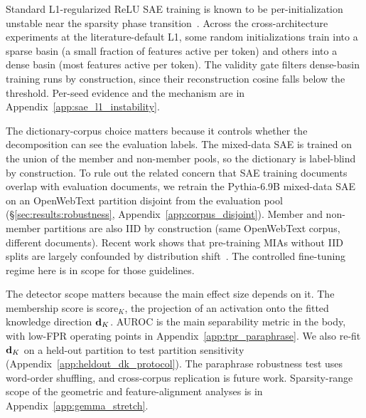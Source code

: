 Standard L1-regularized ReLU SAE training is known to be per-initialization unstable near the sparsity phase transition~\citep{bricken2023monosemanticity, templeton2024scaling}. Across the cross-architecture experiments at the literature-default L1, some random initializations train into a sparse basin (a small fraction of features active per token) and others into a dense basin (most features active per token). The validity gate filters dense-basin training runs by construction, since their reconstruction cosine falls below the threshold. Per-seed evidence and the mechanism are in Appendix~\ref{app:sae_l1_instability}.

The dictionary-corpus choice matters because it controls whether the decomposition can see the evaluation labels. The mixed-data SAE is trained on the union of the member and non-member pools, so the dictionary is label-blind by construction. To rule out the related concern that SAE training documents overlap with evaluation documents, we retrain the Pythia-6.9B mixed-data SAE on an OpenWebText partition disjoint from the evaluation pool (\S\ref{sec:results:robustness}, Appendix~\ref{app:corpus_disjoint}). Member and non-member partitions are also IID by construction (same OpenWebText corpus, different documents). Recent work shows that pre-training MIAs without IID splits are largely confounded by distribution shift~\citep{maini2024dataset, duan2024membership}. The controlled fine-tuning regime here is in scope for those guidelines.

The detector scope matters because the main effect size depends on it. The membership score is score$_K$, the projection of an activation onto the fitted knowledge direction $\mathbf{d}_K$. AUROC is the main separability metric in the body, with low-FPR operating points in Appendix~\ref{app:tpr_paraphrase}. We also re-fit $\mathbf{d}_K$ on a held-out partition to test partition sensitivity (Appendix~\ref{app:heldout_dk_protocol}). The paraphrase robustness test uses word-order shuffling, and cross-corpus replication is future work. Sparsity-range scope of the geometric and feature-alignment analyses is in Appendix~\ref{app:gemma_stretch}.
